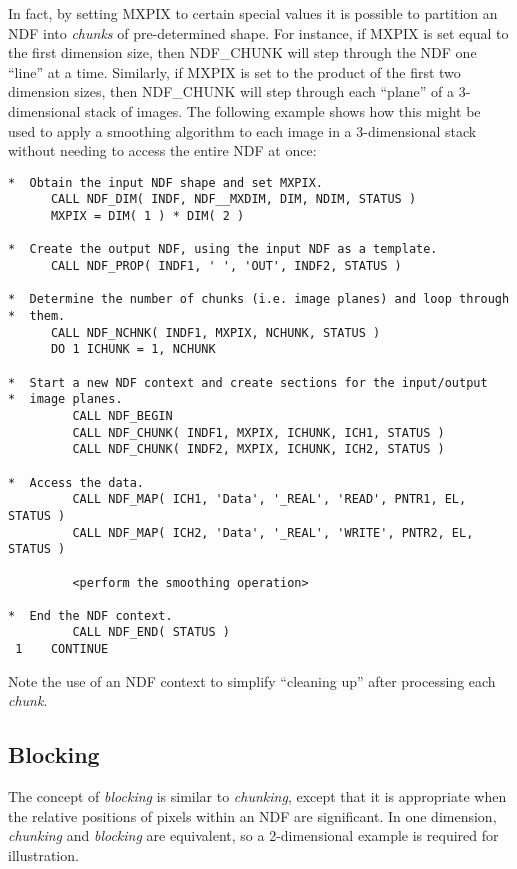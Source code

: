 \documentclass[twoside,11pt]{article}
\newcommand{\xlabel}[1]{}
\newcommand{\st}[1]{{\em{#1}}}
\begin{document}
In fact, by setting MXPIX to certain special values it is possible to partition
an NDF into \st{chunks\/} of pre-determined shape. For instance, if MXPIX is
set equal to the first dimension size, then NDF\_CHUNK will step through the NDF
one ``line'' at a time. Similarly, if MXPIX is set to the product of the first
two dimension sizes, then NDF\_CHUNK will step through each ``plane'' of a
3-dimensional stack of images. The following example shows how this might be
used to apply a smoothing algorithm to each image in a 3-dimensional stack
without needing to access the entire NDF at once:

\small
\begin{verbatim}
*  Obtain the input NDF shape and set MXPIX.
      CALL NDF_DIM( INDF, NDF__MXDIM, DIM, NDIM, STATUS )
      MXPIX = DIM( 1 ) * DIM( 2 )

*  Create the output NDF, using the input NDF as a template.
      CALL NDF_PROP( INDF1, ' ', 'OUT', INDF2, STATUS )

*  Determine the number of chunks (i.e. image planes) and loop through
*  them.
      CALL NDF_NCHNK( INDF1, MXPIX, NCHUNK, STATUS )
      DO 1 ICHUNK = 1, NCHUNK

*  Start a new NDF context and create sections for the input/output
*  image planes.
         CALL NDF_BEGIN
         CALL NDF_CHUNK( INDF1, MXPIX, ICHUNK, ICH1, STATUS )
         CALL NDF_CHUNK( INDF2, MXPIX, ICHUNK, ICH2, STATUS )

*  Access the data.
         CALL NDF_MAP( ICH1, 'Data', '_REAL', 'READ', PNTR1, EL, STATUS )
         CALL NDF_MAP( ICH2, 'Data', '_REAL', 'WRITE', PNTR2, EL, STATUS )

         <perform the smoothing operation>

*  End the NDF context.
         CALL NDF_END( STATUS )
 1    CONTINUE
\end{verbatim}
\normalsize

Note the use of an NDF context to simplify ``cleaning up'' after processing
each \st{chunk}.


\subsection{\xlabel{blocking}Blocking}

The concept of \st{blocking\/} is similar to \st{chunking}, except
that it is appropriate when the relative positions of pixels within an
NDF are significant. In one dimension, \st{chunking\/} and
\st{blocking\/} are equivalent, so a 2-dimensional example is required
for 
illustration.
\end{document}
